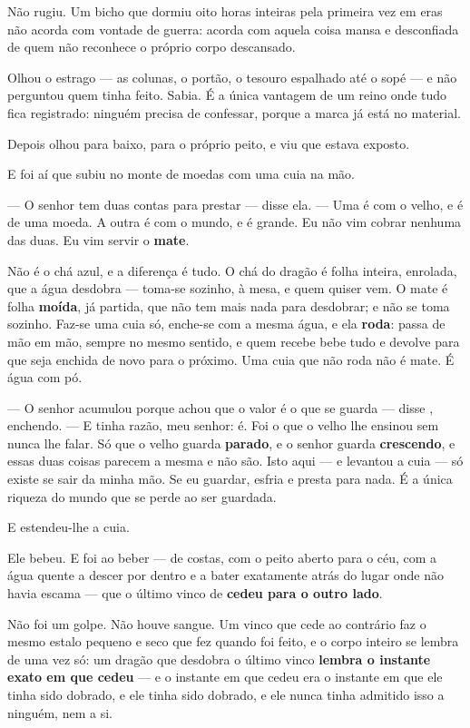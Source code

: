 \documentclass[livro.tex]{subfiles}
\begin{document}
Não rugiu. Um bicho que dormiu oito horas inteiras pela primeira vez em eras não acorda com
vontade de guerra: acorda com aquela coisa mansa e desconfiada de quem não reconhece o próprio
corpo descansado.

Olhou o estrago --- as colunas, o portão, o tesouro espalhado até o sopé --- e não perguntou quem
tinha feito. Sabia. É a única vantagem de um reino onde tudo fica registrado: ninguém precisa de
confessar, porque a marca já está no material.

Depois olhou para baixo, para o próprio peito, e viu que estava exposto.

\medskip

E foi aí que \Qui subiu no monte de moedas com uma cuia na mão.

\medskip

--- O senhor tem duas contas para prestar --- disse ela. --- Uma é com o velho, e é de uma moeda.
A outra é com o mundo, e é grande. Eu não vim cobrar nenhuma das duas. Eu vim servir o
\textbf{mate}.

Não é o chá azul, e a diferença é tudo. O chá do dragão é folha inteira, enrolada, que a água
desdobra --- toma-se sozinho, à mesa, e quem quiser vem. O mate é folha \textbf{moída}, já
partida, que não tem mais nada para desdobrar; e não se toma sozinho. Faz-se uma cuia só,
enche-se com a mesma água, e ela \textbf{roda}: passa de mão em mão, sempre no mesmo sentido, e
quem recebe bebe tudo e devolve para que seja enchida de novo para o próximo. Uma cuia que não
roda não é mate. É água com pó.

--- O senhor acumulou porque achou que o valor é o que se guarda --- disse \Qui , enchendo. --- E
tinha razão, meu senhor: é. Foi o que o velho lhe ensinou sem nunca lhe falar. Só que o velho
guarda \textbf{parado}, e o senhor guarda \textbf{crescendo}, e essas duas coisas parecem a mesma
e não são. Isto aqui --- e levantou a cuia --- só existe se sair da minha mão. Se eu guardar,
esfria e presta para nada. É a única riqueza do mundo que se perde ao ser guardada.

E estendeu-lhe a cuia.

\medskip

Ele bebeu. E foi ao beber --- de costas, com o peito aberto para o céu, com a água quente a
descer por dentro e a bater exatamente atrás do lugar onde não havia escama --- que o último
vinco de \Ven \textbf{cedeu para o outro lado}.

Não foi um golpe. Não houve sangue. Um vinco que cede ao contrário faz o mesmo estalo pequeno e
seco que fez quando foi feito, e o corpo inteiro se lembra de uma vez só: um dragão que desdobra
o último vinco \textbf{lembra o instante exato em que cedeu} --- e o instante em que \Ven cedeu
era o instante em que ele tinha sido dobrado, e ele tinha sido dobrado, e ele nunca tinha
admitido isso a ninguém, nem a si.
\end{document}
